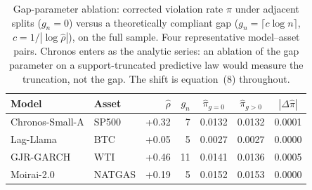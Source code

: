 \begin{table}[htbp]
\centering
\caption{Gap-parameter ablation: corrected violation rate
    $\hat\pi$ under adjacent splits ($g_n = 0$) versus a
    theoretically compliant gap ($g_n = \lceil c \log n \rceil$,
    $c = 1/|\!\log\hat\rho|$), on the full sample. Four representative
    model--asset pairs. Chronos enters as the analytic series: an ablation
    of the gap parameter on a support-truncated predictive law would
    measure the truncation, not the gap. The shift is
    equation~(8) throughout.}
\label{tab:gap_ablation}
\footnotesize
\begin{tabular}{@{}ll rr cc c@{}}
\hline\hline
Model & Asset & $\hat\rho$ & $g_n$
& $\hat\pi_{g=0}$ & $\hat\pi_{g>0}$
& $|\Delta\hat\pi|$ \\
\hline
Chronos-Small-A & SP500 & +0.32 & 7 & 0.0132 & 0.0132 & 0.0001 \\
Lag-Llama & BTC & +0.05 & 5 & 0.0027 & 0.0027 & 0.0000 \\
GJR-GARCH & WTI & +0.46 & 11 & 0.0141 & 0.0136 & 0.0005 \\
Moirai-2.0 & NATGAS & +0.19 & 5 & 0.0152 & 0.0153 & 0.0000 \\
\hline\hline
\end{tabular}
\end{table}
